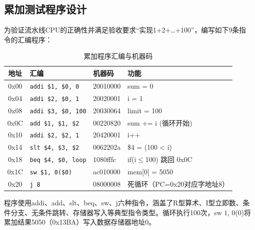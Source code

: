 \subsection{累加测试程序设计}

为验证流水线CPU的正确性并满足验收要求``实现1+2+\ldots+100''，编写如下9条指令的汇编程序：

\begin{table}[htp]
\caption{累加程序汇编与机器码}\label{tab:asm}
\centering
\begin{tabular}{|c|l|l|p{4.5cm}|}
\hline
\textbf{地址} & \textbf{汇编} & \textbf{机器码} & \textbf{功能} \\ \hline\hline
0x00 & \texttt{addi \$1, \$0, 0}    & 20010000 & sum = 0 \\ \hline
0x04 & \texttt{addi \$2, \$0, 1}    & 20020001 & i = 1 \\ \hline
0x08 & \texttt{addi \$3, \$0, 100}  & 20030064 & limit = 100 \\ \hline
0x0C & \texttt{add  \$1, \$1, \$2}  & 00220820 & sum += i (循环开始) \\ \hline
0x10 & \texttt{addi \$2, \$2, 1}    & 20420001 & i++ \\ \hline
0x14 & \texttt{slt  \$4, \$3, \$2}  & 0062202a & \$4 = (100 < i) \\ \hline
0x18 & \texttt{beq  \$4, \$0, loop} & 1080fffc & if(i$\leq$100) 跳回 0x0C \\ \hline
0x1C & \texttt{sw   \$1, 0(\$0)}    & ac010000 & mem[0] = 5050 \\ \hline
0x20 & \texttt{j 8}                  & 08000008 & 死循环（PC=0x20对应字地址8） \\ \hline
\end{tabular}
\end{table}

程序使用addi、add、slt、beq、sw、j六种指令，涵盖了R型算术、I型立即数、条件分支、无条件跳转、存储器写入等典型指令类型。循环执行100次，sw $1$, 0($0$)将累加结果5050（0x13BA）写入数据存储器地址0。
